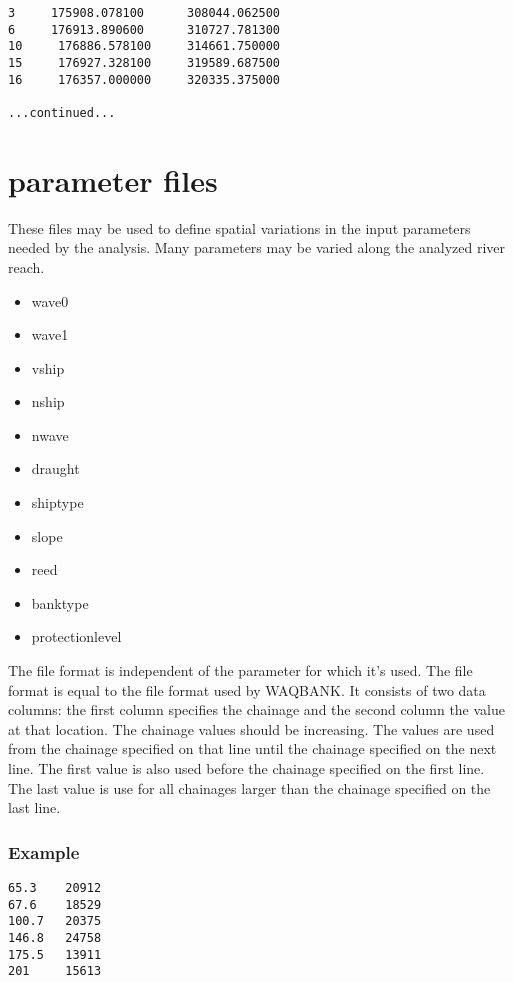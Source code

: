 \begin{Verbatim}
3     175908.078100      308044.062500
6     176913.890600      310727.781300
10     176886.578100     314661.750000
15     176927.328100     319589.687500
16     176357.000000     320335.375000 

...continued...
\end{Verbatim}

\section{parameter files} \label{Sec:parfile}

These files may be used to define spatial variations in the input parameters needed by the analysis.
Many parameters may be varied along the analyzed river reach.

\begin{itemize}
\item wave0
\item wave1
\item vship
\item nship
\item nwave
\item draught
\item shiptype
\item slope
\item reed
\item banktype
\item protectionlevel
\end{itemize}

The file format is independent of the parameter for which it's used.
The file format is equal to the file format used by WAQBANK.
It consists of two data columns: the first column specifies the chainage and the second column the value at that location.
The chainage values should be increasing.
The values are used from the chainage specified on that line until the chainage specified on the next line.
The first value is also used before the chainage specified on the first line.
The last value is use for all chainages larger than the chainage specified on the last line.

\subsubsection*{Example}

\begin{Verbatim}
65.3    20912
67.6    18529
100.7   20375
146.8   24758
175.5   13911
201     15613
\end{Verbatim}

